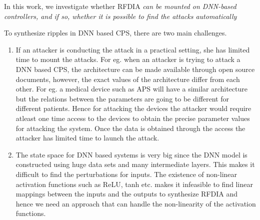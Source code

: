 \fi


In this work, we investigate whether { \ac{RFDIA} \em can be mounted on DNN-based controllers, and if so, whether it is possible to find the attacks automatically }%

\iffalse
To synthesize ripples in DNN based CPS, there are two main challenges.
\begin{enumerate}

	\item If an attacker is conducting the attack in a practical setting, she has limited time to mount the attacks. For eg. when an attacker is trying to attack a DNN based CPS, the architecture can be made available through open source documents, however, the exact values of the architecture differ from each other. For eg. a medical device such as \ac{APS} will have a similar architecture but the relations between the parameters are going to be different for different patients. Hence for attacking the devices the attacker would require atleast one time access to the devices to obtain the precise parameter values for attacking the system. Once the data is obtained through the access the attacker has limited time to launch the attack.  %
	\item The state space for DNN based systems is very big since the DNN model is constructed using huge data sets and many intermediate layers. This makes it difficult to find the perturbations for inputs. The existence of non-linear activation functions such as ReLU, tanh etc. makes it infeasible to find linear mappings between the inputs and the outputs to synthesize \ac{RFDIA} and hence we need an approach that can handle the  non-linearity of the activation functions. 
\end{enumerate}

